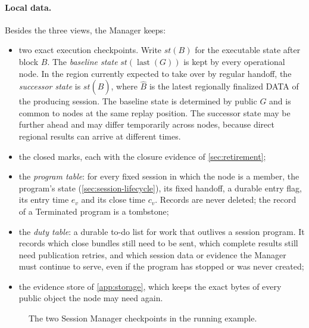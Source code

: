 \documentclass[11pt,a4paper]{article}
\newcommand{\defterm}[1]{\textcolor{rrBlue}{\textit{#1}}}
\begin{document}
\paragraph{Local data.}
Besides the three views, the Manager keeps:
\begin{itemize}
\item two exact execution checkpoints. Write $\mathit{st}(B)$ for the
executable state after block $B$. The \defterm{baseline state}
$\mathit{st}(\operatorname{last}(G))$ is kept by every operational node.
In the region currently expected to take over by regular handoff, the
\defterm{successor state} is $\mathit{st}(\hat B)$, where $\hat B$ is the
latest regionally finalized DATA of the producing session. The baseline
state is determined by public $G$ and is common to nodes at the same
replay position. The successor state may be further ahead and may differ
temporarily across nodes, because direct regional results can arrive at
different times.
\item the closed marks, each with the closure evidence of
\cref{sec:retirement};
\item the \defterm{program table}: for every fixed session in which the
node is a member, the program's state (\cref{sec:session-lifecycle}), its
fixed handoff, a durable entry flag, its entry time $e_v$ and its close
time $c_v$. Records are never deleted; the record of a Terminated
program is a tombstone;
\item the \defterm{duty table}: a durable to-do list for work that
outlives a session program.  It records which close bundles still need
to be sent, which complete results still need publication retries, and
which session data or evidence the Manager must continue to serve, even
if the program has stopped or was never created;
\item the evidence store of \cref{app:storage}, which keeps the exact
bytes of every public object the node may need again.
\end{itemize}

\begin{figure}[htbp]\centering

\caption{The two Session Manager checkpoints in the running example.}
\label{fig:manager-baselines}
\end{figure}
\end{document}
